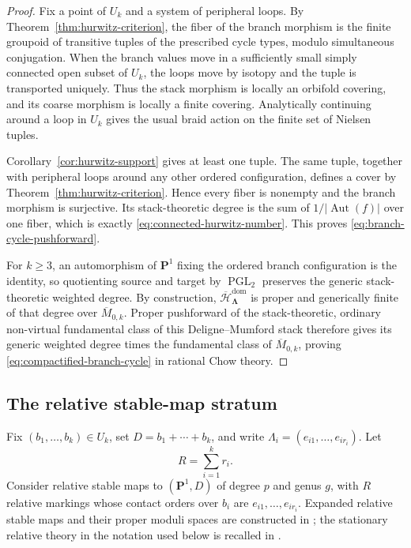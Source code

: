 \documentclass[10pt,a4paper]{amsart}
\numberwithin{equation}{section}
\begin{document}
\begin{proof}
Fix a point of $U_k$ and a system of peripheral loops.  By
Theorem~\ref{thm:hurwitz-criterion}, the fiber of the branch morphism is the
finite groupoid of transitive tuples of the prescribed cycle types, modulo
simultaneous conjugation.  When the branch values move in a sufficiently
small simply connected open subset of $U_k$, the loops move by isotopy and
the tuple is transported uniquely.  Thus the stack morphism is locally an
orbifold covering, and its coarse morphism is locally a finite covering.
Analytically continuing around a loop in $U_k$ gives the usual braid action
on the finite set of Nielsen tuples.

Corollary~\ref{cor:hurwitz-support} gives at least one tuple.  The same tuple,
together with peripheral loops around any other ordered configuration,
defines a cover by Theorem~\ref{thm:hurwitz-criterion}.  Hence every fiber is
nonempty and the branch morphism is surjective.  Its stack-theoretic degree
is the sum of $1/|\operatorname{Aut}(f)|$ over one fiber, which is exactly
\eqref{eq:connected-hurwitz-number}.  This proves
\eqref{eq:branch-cycle-pushforward}.

For $k\geq3$, an automorphism of $\mathbf P^1$ fixing the ordered branch
configuration is the identity, so quotienting source and target by
$\operatorname{PGL}_2$ preserves the generic stack-theoretic weighted
degree.  By construction,
$\overline{\mathcal H}^{\mathrm{dom}}_{\boldsymbol\Lambda}$ is proper and
generically finite of that degree over $\overline M_{0,k}$.  Proper
pushforward of the stack-theoretic, ordinary non-virtual fundamental class of this
Deligne--Mumford stack therefore gives its generic weighted degree times
the fundamental class of $\overline M_{0,k}$, proving
\eqref{eq:compactified-branch-cycle} in rational Chow theory.
\end{proof}

\subsection{The relative stable-map stratum}

Fix $(b_1,\ldots,b_k)\in U_k$, set $D=b_1+\cdots+b_k$, and write
$\Lambda_i=(e_{i1},\ldots,e_{ir_i})$.  Let
\[
 R=\sum_{i=1}^k r_i.
\]
Consider relative stable maps to $(\mathbf P^1,D)$ of degree $p$ and genus
$g$, with $R$ relative markings whose contact orders over $b_i$ are
$e_{i1},\ldots,e_{ir_i}$.  Expanded relative stable maps and their proper
moduli spaces are constructed in \cite{JunLiStable}; the stationary relative
theory in the notation used below is recalled in
\cite[Section~1.2]{OkounkovPandharipande}.
\end{document}
